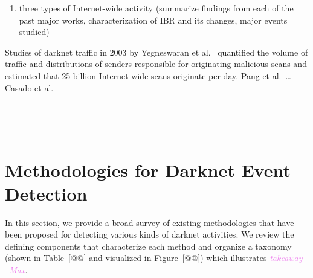 \documentclass[manuscript,nonacm]{acmart}
\newcommand{\maxnote}[1]{\textit{\textcolor{violet}{#1 --Max}}}
\begin{document}
\begin{enumerate}
    \item three types of Internet-wide activity (summarize findings from each of the past major works, characterization of IBR and its changes, major events studied)
\end{enumerate}

Studies of darknet traffic in 2003 by Yegneswaran et al.~\cite{2004yegneswaran} quantified the volume of traffic and distributions of senders responsible for originating malicious scans 
and estimated that 25 billion Internet-wide scans originate per day.
Pang et al.~\cite{2004pang}\dots
Casado et al.~\cite{2005casado}

~\cite{2004yegneswaran,2004pang}

~\cite{2011dainotti,2013benson,2015benson,2012dainotti}~\cite{2021padmanabhan}


\label{sec:frameworks}
\section{Methodologies for Darknet Event Detection}


In this section, we provide a broad survey of existing methodologies that have been proposed for detecting various kinds of darknet activities.
We review the defining components that characterize each method and organize a taxonomy (shown in Table~\ref{@@} and visualized in Figure~\ref{@@}) which illustrates \maxnote{takeaway}.
\end{document}
